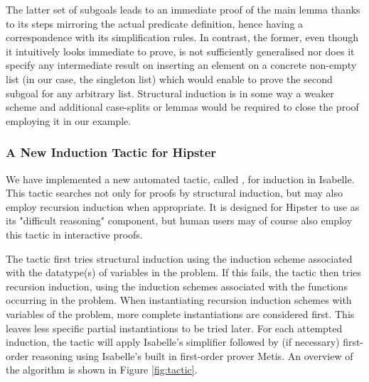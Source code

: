 \noindent The latter set of subgoals leads to an immediate proof of the main lemma thanks to its steps mirroring the actual predicate definition, hence having a correspondence with its simplification rules.
%
In contrast, the former, even though it intuitively looks immediate to prove, is not sufficiently generalised nor does it specify any intermediate result on inserting an element on a concrete non-empty list (in our case, the singleton list) which would enable to prove the second subgoal for any arbitrary list.
%
Structural induction is in some way a weaker scheme and additional case-splits or lemmas would be required to close the proof employing it in our example.


\subsubsection*{A New Induction Tactic for Hipster}


We have implemented a new automated tactic, called , for induction in Isabelle.
%
This tactic searches not only for proofs by structural induction, but may also employ recursion induction when appropriate.
%
It is designed for Hipster to use as its "difficult reasoning" component, but human users may of course also employ this tactic in interactive proofs. 

The tactic first tries structural induction using the induction scheme associated with the datatype(s) of variables in the problem.
%
If this fails, the tactic then tries recursion induction, using the induction schemes associated with the functions occurring in the problem.
%
When instantiating recursion induction schemes with variables of the problem, more complete instantiations are considered first.
%
This leaves less specific partial instantiations to be tried later.
For each attempted induction, the tactic will apply Isabelle's simplifier followed by (if necessary) first-order reasoning using Isabelle's built in first-order prover Metis.
%
An overview of the algorithm is shown in Figure \ref{fig:tactic}.

